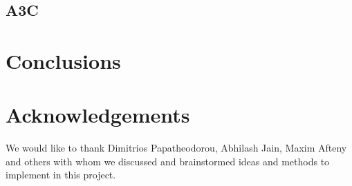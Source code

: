 \documentclass{article}
\begin{document}
\subsection{A3C}


\section{Conclusions}

\label{sec:conclusion}

\section{Acknowledgements}
We would like to thank Dimitrios Papatheodorou, Abhilash Jain, Maxim Afteny and others with whom we discussed and brainstormed ideas and methods to implement in this project.
\clearpage      
{}

\end{document}
